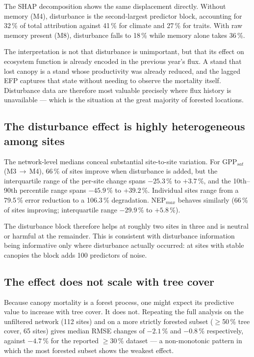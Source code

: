 \documentclass[pdflatex,sn-nature]{sn-jnl}%
\theoremstyle{thmstyleone}%
\theoremstyle{thmstyletwo}%
\theoremstyle{thmstylethree}%
\begin{document}
The SHAP decomposition shows the same displacement directly. Without memory (M4), disturbance is the second-largest predictor block, accounting for 32\,\% of total attribution against 41\,\% for climate and 27\,\% for traits. With raw memory present (M8), disturbance falls to 18\,\% while memory alone takes 36\,\%.

The interpretation is not that disturbance is unimportant, but that its effect on ecosystem function is already encoded in the previous year's flux. A stand that lost canopy is a stand whose productivity was already reduced, and the lagged EFP captures that state without needing to observe the mortality itself. Disturbance data are therefore most valuable precisely where flux history is unavailable --- which is the situation at the great majority of forested locations.

\subsection{The disturbance effect is highly heterogeneous among sites}

The network-level medians conceal substantial site-to-site variation. For GPP$_{sat}$ (M3\,$\rightarrow$\,M4), 66\,\% of sites improve when disturbance is added, but the interquartile range of the per-site change spans $-25.3$\,\% to $+3.7$\,\%, and the 10th--90th percentile range spans $-45.9$\,\% to $+39.2$\,\%. Individual sites range from a 79.5\,\% error reduction to a 106.3\,\% degradation. NEP$_{max}$ behaves similarly (66\,\% of sites improving; interquartile range $-29.9$\,\% to $+5.8$\,\%).

The disturbance block therefore helps at roughly two sites in three and is neutral or harmful at the remainder. This is consistent with disturbance information being informative only where disturbance actually occurred: at sites with stable canopies the block adds 100 predictors of noise.

\subsection{The effect does not scale with tree cover}

Because canopy mortality is a forest process, one might expect its predictive value to increase with tree cover. It does not. Repeating the full analysis on the unfiltered network (112 sites) and on a more strictly forested subset ($\geq$50\,\% tree cover, 65 sites) gives median RMSE changes of $-2.1$\,\% and $-0.8$\,\% respectively, against $-4.7$\,\% for the reported $\geq$30\,\% dataset --- a non-monotonic pattern in which the most forested subset shows the weakest effect.
\end{document}
